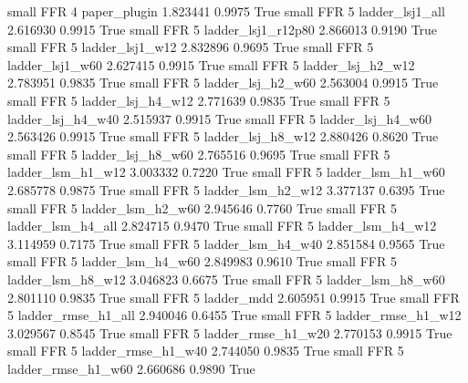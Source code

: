      small      FFR                 4             paper_plugin   1.823441      0.9975    True
     small      FFR                 5          ladder_lsj1_all   2.616930      0.9915    True
     small      FFR                 5       ladder_lsj1_r12p80   2.866013      0.9190    True
     small      FFR                 5          ladder_lsj1_w12   2.832896      0.9695    True
     small      FFR                 5          ladder_lsj1_w60   2.627415      0.9915    True
     small      FFR                 5        ladder_lsj_h2_w12   2.783951      0.9835    True
     small      FFR                 5        ladder_lsj_h2_w60   2.563004      0.9915    True
     small      FFR                 5        ladder_lsj_h4_w12   2.771639      0.9835    True
     small      FFR                 5        ladder_lsj_h4_w40   2.515937      0.9915    True
     small      FFR                 5        ladder_lsj_h4_w60   2.563426      0.9915    True
     small      FFR                 5        ladder_lsj_h8_w12   2.880426      0.8620    True
     small      FFR                 5        ladder_lsj_h8_w60   2.765516      0.9695    True
     small      FFR                 5        ladder_lsm_h1_w12   3.003332      0.7220    True
     small      FFR                 5        ladder_lsm_h1_w60   2.685778      0.9875    True
     small      FFR                 5        ladder_lsm_h2_w12   3.377137      0.6395    True
     small      FFR                 5        ladder_lsm_h2_w60   2.945646      0.7760    True
     small      FFR                 5        ladder_lsm_h4_all   2.824715      0.9470    True
     small      FFR                 5        ladder_lsm_h4_w12   3.114959      0.7175    True
     small      FFR                 5        ladder_lsm_h4_w40   2.851584      0.9565    True
     small      FFR                 5        ladder_lsm_h4_w60   2.849983      0.9610    True
     small      FFR                 5        ladder_lsm_h8_w12   3.046823      0.6675    True
     small      FFR                 5        ladder_lsm_h8_w60   2.801110      0.9835    True
     small      FFR                 5               ladder_mdd   2.605951      0.9915    True
     small      FFR                 5       ladder_rmse_h1_all   2.940046      0.6455    True
     small      FFR                 5       ladder_rmse_h1_w12   3.029567      0.8545    True
     small      FFR                 5       ladder_rmse_h1_w20   2.770153      0.9915    True
     small      FFR                 5       ladder_rmse_h1_w40   2.744050      0.9835    True
     small      FFR                 5       ladder_rmse_h1_w60   2.660686      0.9890    True
